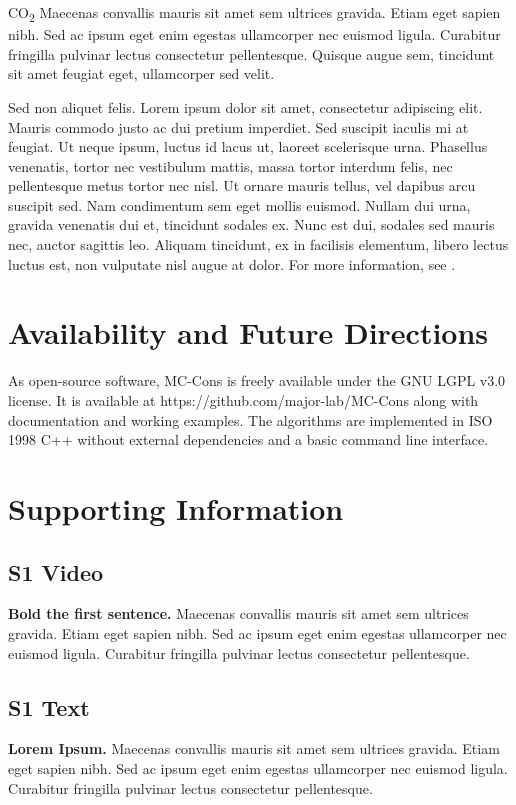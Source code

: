 \documentclass[10pt,letterpaper]{article}
\begin{document}
CO\textsubscript{2} Maecenas convallis mauris sit amet sem ultrices gravida. Etiam eget sapien nibh. Sed ac ipsum eget enim egestas ullamcorper nec euismod ligula. Curabitur fringilla pulvinar lectus consectetur pellentesque. Quisque augue sem, tincidunt sit amet feugiat eget, ullamcorper sed velit. 

Sed non aliquet felis. Lorem ipsum dolor sit amet, consectetur adipiscing elit. Mauris commodo justo ac dui pretium imperdiet. Sed suscipit iaculis mi at feugiat. Ut neque ipsum, luctus id lacus ut, laoreet scelerisque urna. Phasellus venenatis, tortor nec vestibulum mattis, massa tortor interdum felis, nec pellentesque metus tortor nec nisl. Ut ornare mauris tellus, vel dapibus arcu suscipit sed. Nam condimentum sem eget mollis euismod. Nullam dui urna, gravida venenatis dui et, tincidunt sodales ex. Nunc est dui, sodales sed mauris nec, auctor sagittis leo. Aliquam tincidunt, ex in facilisis elementum, libero lectus luctus est, non vulputate nisl augue at dolor. For more information, see .

\section*{Availability and Future Directions} %
As open-source software, MC-Cons is freely available under the GNU LGPL v3.0 license. It is available at https://github.com/major-lab/MC-Cons along with documentation and working examples. The algorithms are implemented in ISO 1998 C++ without external dependencies and a basic command line interface.

\newpage
\section*{Supporting Information}

\subsection*{S1 Video}
\label{S1_Video}
{\bf Bold the first sentence.}  Maecenas convallis mauris sit amet sem ultrices gravida. Etiam eget sapien nibh. Sed ac ipsum eget enim egestas ullamcorper nec euismod ligula. Curabitur fringilla pulvinar lectus consectetur pellentesque.

\subsection*{S1 Text}
\label{S1_Text}
{\bf Lorem Ipsum.} Maecenas convallis mauris sit amet sem ultrices gravida. Etiam eget sapien nibh. Sed ac ipsum eget enim egestas ullamcorper nec euismod ligula. Curabitur fringilla pulvinar lectus consectetur pellentesque.
\end{document}

